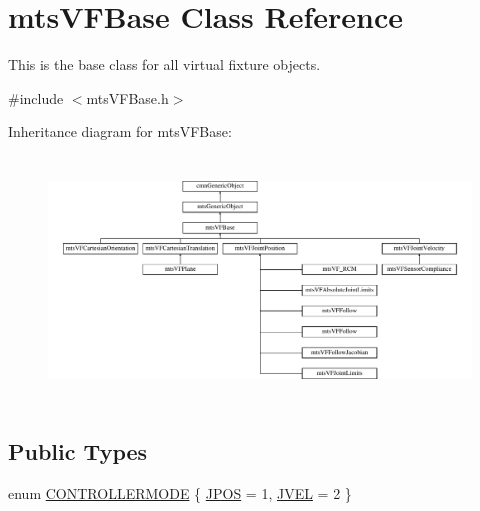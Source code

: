 \hypertarget{classmts_v_f_base}{\section{mts\-V\-F\-Base Class Reference}
\label{classmts_v_f_base}
}


This is the base class for all virtual fixture objects.  




{\ttfamily \#include $<$mts\-V\-F\-Base.\-h$>$}

Inheritance diagram for mts\-V\-F\-Base\-:\begin{figure}[H]
\begin{center}
\leavevmode
\includegraphics[height=6.549707cm]{d4/d95/classmts_v_f_base}
\end{center}
\end{figure}
\subsection*{Public Types}
\begin{DoxyCompactItemize}
\item 
enum \hyperlink{classmts_v_f_base_a742dd08f8b70bafeb746cec14d9ee974}{C\-O\-N\-T\-R\-O\-L\-L\-E\-R\-M\-O\-D\-E} \{ \hyperlink{classmts_v_f_base_a742dd08f8b70bafeb746cec14d9ee974a6639d5ab298255f1c757007f7f95a348}{J\-P\-O\-S} = 1, 
\hyperlink{classmts_v_f_base_a742dd08f8b70bafeb746cec14d9ee974ad7f45d2df799c9b4af6977e674b69a84}{J\-V\-E\-L} = 2
 \}
\end{DoxyCompactItemize}
